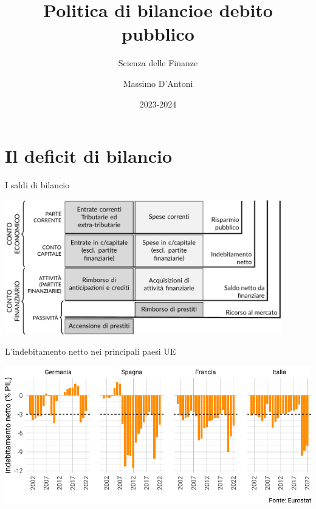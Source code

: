 \documentclass[aspectratio=149,11pt,italian]{beamer}
\institute{Università di Siena}
\author{Massimo D'Antoni}
\date{2023-2024}
\title{Politica di bilancio\newline e debito pubblico}
\subtitle{Scienza delle Finanze}
\begin{document}
\maketitle

\section{Il deficit di bilancio}

\begin{frame}{I saldi di bilancio}
\begin{center}
\centering
\includegraphics[width=12cm]{./figure/saldi-di-bilancio.pdf}
\end{center}
\end{frame}

\begin{frame}{L'indebitamento netto nei principali paesi UE}
\begin{center}
\centering
\includegraphics[width=\textwidth]{./figure/deficit-4countries-2000-2022-color.pdf}
\end{center}
\end{frame}
\end{document}
